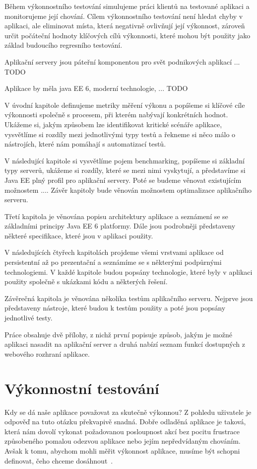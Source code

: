 \documentclass[122pt,oneside]{fithesis}
\begin{document}
Během výkonnostního testování simulujeme práci klientů na testované aplikaci a monitorujeme její chování. Cílem výkonnostního testování není hledat chyby v aplikaci, ale eliminovat místa, která negativně ovlivňují její výkonnost, zároveň určit počáteční hodnoty klíčových cílů výkonnosti, které mohou být použity jako základ budoucího regresního testování.

Aplikační servery jsou páteřní komponentou pro svět podnikových aplikací ... TODO

Aplikace by měla java EE 6, moderní technologie, ... TODO

V úvodní kapitole definujeme metriky měření výkonu a popíšeme si klíčové cíle výkonnosti společně s procesem, při kterém nabývají konkrétních hodnot. Ukážeme si, jakým způsobem lze identifikovat kritické scénáře aplikace, vysvětlíme si rozdíly mezi jednotlivými typy testů a řekneme si něco málo o nástrojích, které nám pomáhají s automatizací testů.

V následující kapitole si vysvětlíme pojem benchmarking, popíšeme si základní typy serverů, ukážeme si rozdíly, které se mezi nimi vyskytují, a představíme si Java EE plný profil pro aplikační servery. Poté se budeme věnovat existujícím možnostem .... Závěr kapitoly bude věnován možnostem optimalizace aplikačního serveru.

Třetí kapitola je věnována popisu architektury aplikace a seznámení se se základními principy Java EE 6 platformy. Dále jsou podrobněji představeny některé specifikace, které jsou v aplikaci použity.

V následujících čtyřech kapitolách projdeme všemi vrstvami aplikace od persistentní až po prezentační a seznámíme se s některými podpůrnými technologiemi. V každé kapitole budou popsány technologie, které byly v aplikaci použity společně s ukázkami kódu a některých řešení.

Závěrečná kapitola je věnována několika testům aplikačního serveru. Nejprve jsou představeny nástroje, které budou k testům použity a poté jsou popsány jednotlivé testy.

Práce obsahuje dvě přílohy, z nichž první popisuje způsob, jakým je možné aplikaci nasadit na aplikační server a druhá nabízí seznam funkcí dostupných z webového rozhraní aplikace.

\chapter{Výkonnostní testování}

Kdy se dá naše aplikace považovat za skutečně výkonnou? Z pohledu uživatele je odpověď na tuto otázku překvapivě snadná. Dobře odladěná aplikace je taková, která nám dovolí vykonat požadovanou posloupnost akcí bez pocitu frustrace způsobeného pomalou odezvou aplikace nebo jejím nepředvídaným chováním. Avšak k tomu, abychom mohli měřit výkonnost aplikace, musíme být schopni definovat, čeho chceme dosáhnout~\cite{molyneaux09}.
\end{document}
